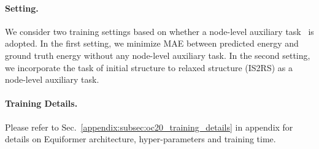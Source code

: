 \vspace{-3.25mm}
\paragraph{Setting.}
We consider two training settings based on whether a node-level auxiliary task~\citep{noisy_nodes} is adopted.
In the first setting, we minimize MAE between predicted energy and ground truth energy without any node-level auxiliary task.
In the second setting, we incorporate the task of initial structure to relaxed structure (IS2RS) as a node-level auxiliary task.

\vspace{-3.25mm}
\paragraph{Training Details.}
Please refer to Sec.~\ref{appendix:subsec:oc20_training_details} in appendix for details on Equiformer architecture, hyper-parameters and training time.


\vspace{-3.25mm}
